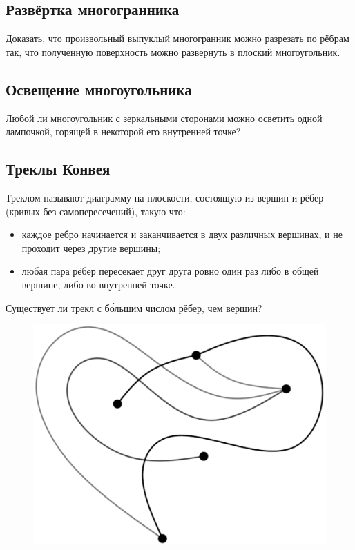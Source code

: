 \subsection*{Развёртка многогранника}

Доказать, что произвольный выпуклый многогранник можно разрезать по рёбрам так, что полученную поверхность можно развернуть в плоский многоугольник.

\subsection*{Освещение многоугольника}


{\sloppy

Любой ли многоугольник с зеркальными сторонами можно осветить одной лампочкой, горящей в некоторой его внутренней точке?

}

\subsection*{Треклы Конвея}

Треклом называют диаграмму на плоскости, состоящую из вершин и рёбер (кривых без самопересечений), такую что:
\begin{itemize}
\item каждое ребро начинается и заканчивается в двух различных вершинах, и не проходит через другие вершины;
\item любая пара рёбер пересекает друг друга ровно один раз либо в общей вершине, либо во внутренней точке.
\end{itemize}

Существует ли трекл с б\'{о}льшим числом рёбер, чем вершин?

\begin{figure}[h!]
\centering
\includegraphics[scale=0.5]{Figs/UnsolvedPuzzles/thrack}
\end{figure}

